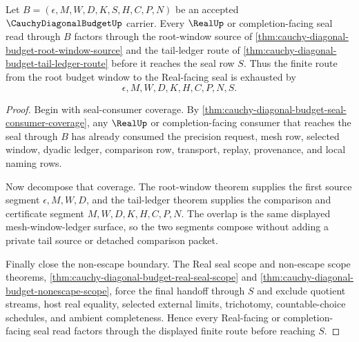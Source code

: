 \begin{theorem}
\label{thm:cauchy-diagonal-budget-real-seal-handoff-totality}
Let $B=(\epsilon,M,W,D,K,S,H,C,P,N)$ be an accepted $\CauchyDiagonalBudgetUp$ carrier. Every $\RealUp$ or completion-facing seal read through $B$ factors through the root-window source of \autoref{thm:cauchy-diagonal-budget-root-window-source} and the tail-ledger route of \autoref{thm:cauchy-diagonal-budget-tail-ledger-route} before it reaches the seal row $S$. Thus the finite route from the root budget window to the Real-facing seal is exhausted by
$$
\epsilon,M,W,D,K,H,C,P,N,S.
$$
\end{theorem}
\begin{proof}
Begin with seal-consumer coverage. By \autoref{thm:cauchy-diagonal-budget-seal-consumer-coverage}, any $\RealUp$ or completion-facing consumer that reaches the seal through $B$ has already consumed the precision request, mesh row, selected window, dyadic ledger, comparison row, transport, replay, provenance, and local naming rows.

Now decompose that coverage. The root-window theorem supplies the first source segment $\epsilon,M,W,D$, and the tail-ledger theorem supplies the comparison and certificate segment $M,W,D,K,H,C,P,N$. The overlap is the same displayed mesh-window-ledger surface, so the two segments compose without adding a private tail source or detached comparison packet.

Finally close the non-escape boundary. The Real seal scope and non-escape scope theorems, \autoref{thm:cauchy-diagonal-budget-real-seal-scope} and \autoref{thm:cauchy-diagonal-budget-nonescape-scope}, force the final handoff through $S$ and exclude quotient streams, host real equality, selected external limits, trichotomy, countable-choice schedules, and ambient completeness. Hence every Real-facing or completion-facing seal read factors through the displayed finite route before reaching $S$.
\end{proof}

